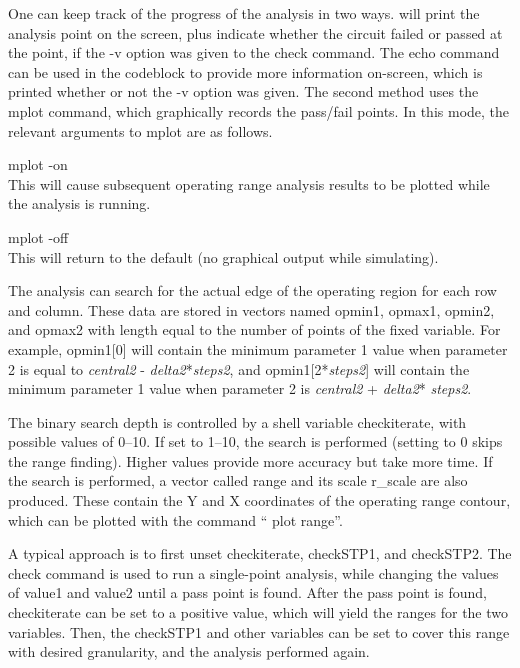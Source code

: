 One can keep track of the progress of the analysis in two ways. 
{\WRspice} will print the analysis point on the screen, plus indicate
whether the circuit failed or passed at the point, if the {\vt -v}
option was given to the {\cb check} command.  The {\cb echo} command can
be used in the codeblock to provide more information on-screen, which
is printed whether or not the {\vt -v} option was given.  The second
method uses the {\cb mplot} command, which graphically records the
pass/fail points.  In this mode, the relevant arguments to {\cb mplot}
are as follows.
\begin{description}
\item{\vt mplot -on}\\
This will cause subsequent operating range analysis results to be plotted
while the analysis is running.

\item{\vt mplot -off}\\
This will return to the default (no graphical output while simulating).
\end{description}

The analysis can search for the actual edge of the operating region
for each row and column.  These data are stored in vectors named {\et
opmin1}, {\et opmax1}, {\et opmin2}, and {\et opmax2} with length
equal to the number of points of the fixed variable.  For example,
{\vt opmin1[0]} will contain the minimum parameter 1 value when
parameter 2 is equal to {\it central2} - {\it delta2\/}*{\it steps2},
and {\vt opmin1[2*{\it steps2\/}]} will contain the minimum parameter
1 value when parameter 2 is {\it central2} + {\it delta2}*{\it
steps2}.

The binary search depth is controlled by a shell variable {\et
checkiterate}, with possible values of 0--10.  If set to 1--10, the
search is performed (setting to 0 skips the range finding).  Higher
values provide more accuracy but take more time.  If the search is
performed, a vector called {\et range} and its scale {\et r\_scale}
are also produced.  These contain the Y and X coordinates of the
operating range contour, which can be plotted with the command ``{\vt
plot range}''.

A typical approach is to first unset {\et checkiterate}, {\et
checkSTP1}, and {\et checkSTP2}.  The {\cb check} command is used to
run a single-point analysis, while changing the values of {\et value1}
and {\et value2} until a pass point is found.  After the pass point is
found, {\et checkiterate} can be set to a positive value, which will
yield the ranges for the two variables.  Then, the {\et checkSTP1} and
other variables can be set to cover this range with desired
granularity, and the analysis performed again.

